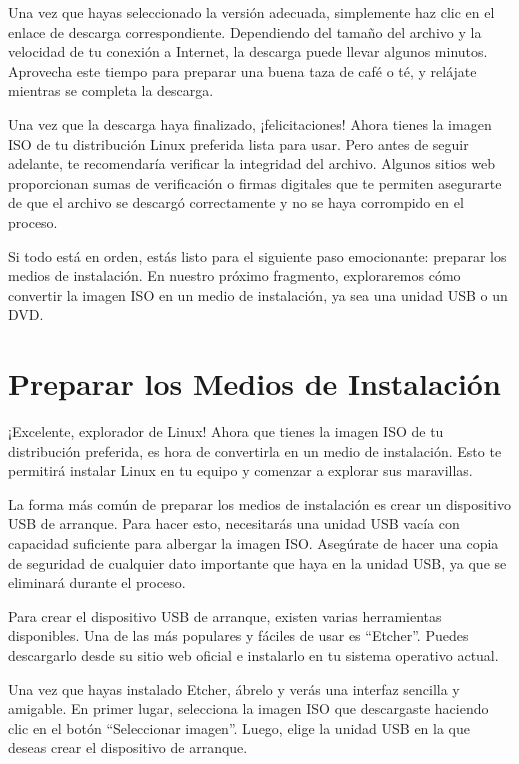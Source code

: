 \documentclass[
  jou,
  floatsintext,
  longtable,
  a4paper,
  nolmodern,
  notxfonts,
  notimes,
  12pt,
  colorlinks=true,linkcolor=blue,citecolor=blue,urlcolor=blue]{apa7}
\begin{document}
Una vez que hayas seleccionado la versión adecuada, simplemente haz clic
en el enlace de descarga correspondiente. Dependiendo del tamaño del
archivo y la velocidad de tu conexión a Internet, la descarga puede
llevar algunos minutos. Aprovecha este tiempo para preparar una buena
taza de café o té, y relájate mientras se completa la descarga.

Una vez que la descarga haya finalizado, ¡felicitaciones! Ahora tienes
la imagen ISO de tu distribución Linux preferida lista para usar. Pero
antes de seguir adelante, te recomendaría verificar la integridad del
archivo. Algunos sitios web proporcionan sumas de verificación o firmas
digitales que te permiten asegurarte de que el archivo se descargó
correctamente y no se haya corrompido en el proceso.

Si todo está en orden, estás listo para el siguiente paso emocionante:
preparar los medios de instalación. En nuestro próximo fragmento,
exploraremos cómo convertir la imagen ISO en un medio de instalación, ya
sea una unidad USB o un DVD.

\section{Preparar los Medios de
Instalación}\label{preparar-los-medios-de-instalaciuxf3n}

¡Excelente, explorador de Linux! Ahora que tienes la imagen ISO de tu
distribución preferida, es hora de convertirla en un medio de
instalación. Esto te permitirá instalar Linux en tu equipo y comenzar a
explorar sus maravillas.

La forma más común de preparar los medios de instalación es crear un
dispositivo USB de arranque. Para hacer esto, necesitarás una unidad USB
vacía con capacidad suficiente para albergar la imagen ISO. Asegúrate de
hacer una copia de seguridad de cualquier dato importante que haya en la
unidad USB, ya que se eliminará durante el proceso.

Para crear el dispositivo USB de arranque, existen varias herramientas
disponibles. Una de las más populares y fáciles de usar es ``Etcher''.
Puedes descargarlo desde su sitio web oficial e instalarlo en tu sistema
operativo actual.

Una vez que hayas instalado Etcher, ábrelo y verás una interfaz sencilla
y amigable. En primer lugar, selecciona la imagen ISO que descargaste
haciendo clic en el botón ``Seleccionar imagen''. Luego, elige la unidad
USB en la que deseas crear el dispositivo de arranque.
\end{document}
